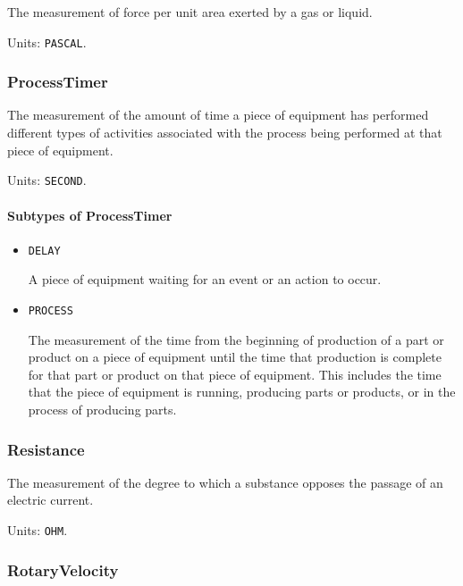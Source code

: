 The measurement of force per unit area exerted by a gas or liquid.


Units: \texttt{PASCAL}.

\subsubsection{ProcessTimer}
\label{sec:ProcessTimer}



The measurement of the amount of time a piece of equipment has performed different types of activities associated with the process being performed at that piece of equipment.


Units: \texttt{SECOND}.

\paragraph{Subtypes of ProcessTimer}\mbox{}
\label{sec:Subtypes of ProcessTimer}

\begin{itemize}

\item \texttt{DELAY}


A piece of equipment waiting for an event or an action to occur.

\item \texttt{PROCESS}


The measurement of the time from the beginning of production of a part or product on a piece of equipment until the time that production is complete for that part or product on that piece of equipment.  This includes the time that the piece of equipment is running, producing parts or products, or in the process of producing parts.


\end{itemize}

\subsubsection{Resistance}
\label{sec:Resistance}



The measurement of the degree to which a substance opposes the passage of an electric current.


Units: \texttt{OHM}.

\subsubsection{RotaryVelocity}
\label{sec:RotaryVelocity}



